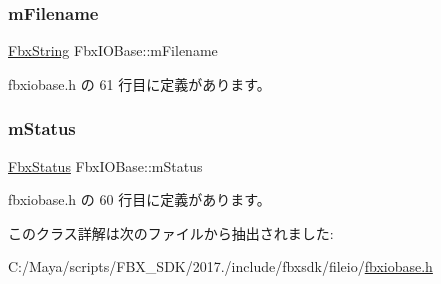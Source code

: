 \subsubsection{\texorpdfstring{m\+Filename}{mFilename}}
{\footnotesize\ttfamily \hyperlink{class_fbx_string}{Fbx\+String} Fbx\+I\+O\+Base\+::m\+Filename\hspace{0.3cm}{\ttfamily [protected]}}



 fbxiobase.\+h の 61 行目に定義があります。

\mbox{\label{class_fbx_i_o_base_a7fd6efae8ba3697e4d242dc5412289aa}} 
\subsubsection{\texorpdfstring{m\+Status}{mStatus}}
{\footnotesize\ttfamily \hyperlink{class_fbx_status}{Fbx\+Status} Fbx\+I\+O\+Base\+::m\+Status\hspace{0.3cm}{\ttfamily [protected]}}



 fbxiobase.\+h の 60 行目に定義があります。



このクラス詳解は次のファイルから抽出されました\+:\begin{DoxyCompactItemize}
\item 
C\+:/\+Maya/scripts/\+F\+B\+X\+\_\+\+S\+D\+K/2017./include/fbxsdk/fileio/\hyperlink{fbxiobase_8h}{fbxiobase.\+h}\end{DoxyCompactItemize}
